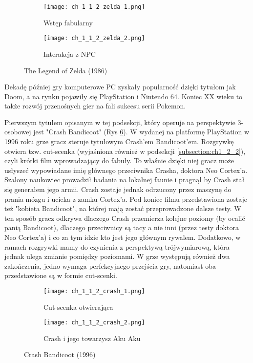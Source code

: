 \begin{figure}[h]
	\begin{subfigure}{0.49\textwidth}
		\caption{Wstęp fabularny}
		\texttt{[image: ch\_1\_1\_2\_zelda\_1.png]}
		\label{subfig:ch_1_1_2_zelda_1}
	\end{subfigure}
	\begin{subfigure}{0.49\textwidth}
		\caption{Interakcja z NPC}
		\texttt{[image: ch\_1\_1\_2\_zelda\_2.png]}
		\label{subfig:ch_1_1_2_zelda_2}
	\end{subfigure}
	\caption{The Legend of Zelda (1986)}
	\label{fig:ch1_1_2_zelda}
\end{figure}

Dekadę później gry komputerowe PC zyskały popularność dzięki tytułom jak Doom, a na rynku
pojawiły się PlayStation i Nintendo 64. Koniec XX wieku to także rozwój przenośnych gier na
fali sukcesu serii Pokemon.

Pierwszym tytułem opisanym w tej podsekcji, który operuje na perspektywie 3-osobowej jest
"Crash Bandicoot" (Rys \ref{fig:ch1_1_2_crash}). W wydanej na platformę PlayStation w 1996 roku grze
gracz steruje tytułowym Crash'em Bandicoot'em. Rozgrywkę otwiera tzw. cut-scenka (wyjaśniona również w
podsekcji \ref{subsection:ch1_2_2}), czyli krótki film wprowadzający do fabuły. To właśnie dzięki niej
gracz może usłyszeć wypowiadane imię głównego przeciwnika Crasha, doktora Neo Cortex'a.
Szalony naukowiec prowadził badania na lokalnej faunie i pragnął by Crash
stał się generałem jego armii. Crash zostaje jednak odrzucony przez maszynę do prania mózgu i ucieka
z zamku Cortex'a. Pod koniec filmu przedstawiona zostaje też "kobieta Bandicoot", na której mają zostać
przeprowadzone dalsze testy. W ten sposób gracz odkrywa dlaczego Crash przemierza kolejne poziomy (by ocalić
panią Bandicoot), dlaczego przeciwnicy są tacy a nie inni (przez testy doktora Neo Cortex'a) i co za tym
idzie kto jest jego głównym rywalem. Dodatkowo, w ramach rozgrywki mamy do czynienia z perspektywą
trójwymiarową, która jednak ulega zmianie pomiędzy poziomami. W grze występują również dwa zakończenia,
jedno wymaga perfekcyjnego przejścia gry, natomiast oba przedstawione są w formie cut-scenki.

\begin{figure}[h]
	\begin{subfigure}{0.49\textwidth}
		\caption{Cut-scenka otwierająca}
		\texttt{[image: ch\_1\_1\_2\_crash\_1.png]}
		\label{subfig:ch_1_1_2_crash_1}
	\end{subfigure}
	\begin{subfigure}{0.49\textwidth}
		\caption{Crash i jego towarzysz Aku Aku}
		\texttt{[image: ch\_1\_1\_2\_crash\_2.png]}
		\label{subfig:ch_1_1_2_crash_2}
	\end{subfigure}
	\caption{Crash Bandicoot (1996)}
	\label{fig:ch1_1_2_crash}
\end{figure}

